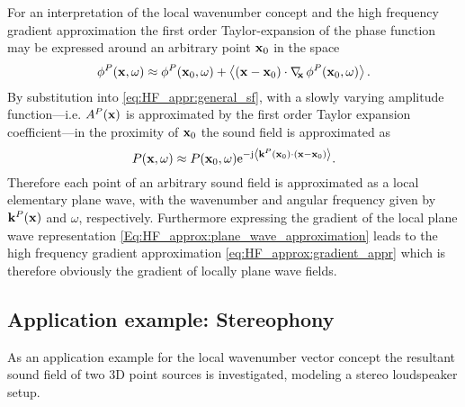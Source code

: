 \vspace{3mm}
For an interpretation of the local wavenumber concept and the high frequency gradient approximation the first order Taylor-expansion of the phase function may be expressed around an arbitrary point $\mathbf{x}_0$ in the space
\begin{equation}
\phi^P(\mathbf{x},\omega) \approx \phi^P(\mathbf{x}_0,\omega) + \left< (\mathbf{x}-\mathbf{x}_0) \cdot \nabla_{\!\!\mathbf{x}}\, \phi^P(\mathbf{x}_0,\omega) \right>.
\end{equation}
By substitution into \eqref{eq:HF_appr:general_sf}, with a slowly varying amplitude function---i.e. $A^P(\mathbf{x})$ is approximated by the first order Taylor expansion coefficient---in the proximity of $\mathbf{x}_0$ the sound field is approximated as
\begin{equation}
\label{Eq:HF_approx:plane_wave_approximation}
P(\mathbf{x},\omega) \approx P(\mathbf{x}_0,\omega) \mathrm{e}^{-\mathrm{j}  \left< \mathbf{k}^P(\mathbf{x}_0) \cdot \left( \mathbf{x} - \mathbf{x}_0 \right) \right>}.
\end{equation}
Therefore each point of an arbitrary sound field is approximated as a local elementary plane wave, with the wavenumber and angular frequency given by $\mathbf{k}^P(\mathbf{x})$ and $\omega$, respectively.
Furthermore expressing the gradient of the local plane wave representation \eqref{Eq:HF_approx:plane_wave_approximation} leads to the high frequency gradient approximation \eqref{eq:HF_approx:gradient_appr} which is therefore obviously the gradient of locally plane wave fields.

\subsection*{Application example: Stereophony}

As an application example for the local wavenumber vector concept the resultant sound field of two 3D point sources is investigated, modeling a stereo loudspeaker setup.

